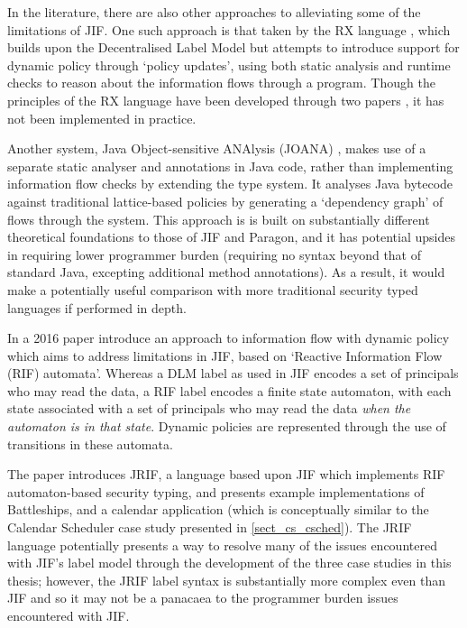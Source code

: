 In the literature, there are also other approaches to alleviating some of the limitations of JIF. One such approach is that taken by the RX language \cite{swamy06rx}, which builds upon the Decentralised Label Model but attempts to introduce support for dynamic policy through `policy updates', using both static analysis and runtime checks to reason about the information flows through a program. Though the principles of the RX language have been developed through two papers \cite{hicks05rx} \cite{swamy06rx}, it has not been implemented in practice.

Another system, Java Object-sensitive ANAlysis (JOANA) \cite{graf2013joana}, makes use of a separate static analyser and annotations in Java code, rather than implementing information flow checks by extending the type system. It analyses Java bytecode against traditional lattice-based policies by generating a `dependency graph' of flows through the system. This approach is is built on substantially different theoretical foundations to those of JIF and Paragon, and it has potential upsides in requiring lower programmer burden (requiring no syntax beyond that of standard Java, excepting additional method annotations). As a result, it would make a potentially useful comparison with more traditional security typed languages if performed in depth.

In a 2016 paper \citeauthor{kozyri2016jrif} \cite{kozyri2016jrif} introduce an approach to information flow with dynamic policy which aims to address limitations in JIF, based on `Reactive Information Flow (RIF) automata'. Whereas a DLM label as used in JIF encodes a set of principals who may read the data, a RIF label encodes a finite state automaton, with each state associated with a set of principals who may read the data \textit{when the automaton is in that state}. Dynamic policies are represented through the use of transitions in these automata.

The paper \cite{kozyri2016jrif} introduces JRIF, a language based upon JIF which implements RIF automaton-based security typing, and presents example implementations of Battleships, and a calendar application (which is conceptually similar to the Calendar Scheduler case study presented in \ref{sect_cs_csched}). The JRIF language potentially presents a way to resolve many of the issues encountered with JIF's label model through the development of the three case studies in this thesis; however, the JRIF label syntax is substantially more complex even than JIF and so it may not be a panacaea to the programmer burden issues encountered with JIF.

